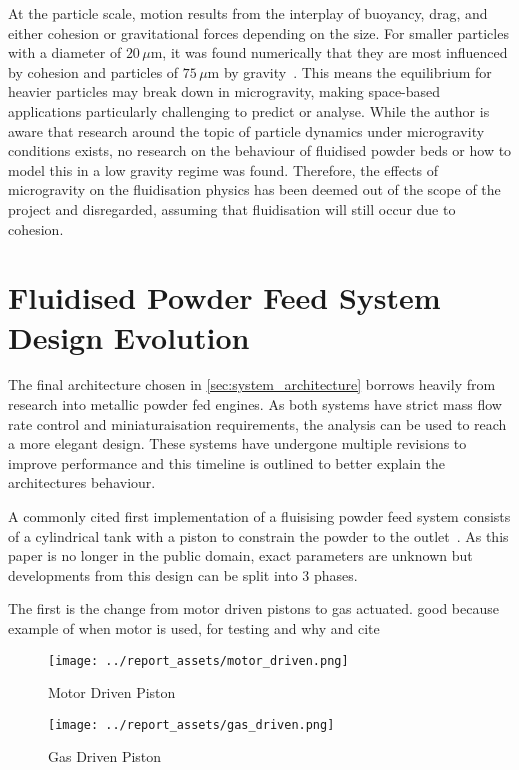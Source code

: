At the particle scale, motion results from the interplay of buoyancy, drag, and either cohesion or gravitational forces depending on the size. For smaller particles with a diameter of $20\,\mu\mathrm{m}$, it was found numerically that they are most influenced by cohesion and particles of $75\,\mu\mathrm{m}$ by gravity~\cite{SUN201785}.  This means the equilibrium for heavier particles may break down in microgravity, making space-based applications particularly challenging to predict or analyse. While the author is aware that research around the topic of particle dynamics under microgravity conditions exists, no research on the behaviour of fluidised powder beds or how to model this in a low gravity regime was found. Therefore, the effects of microgravity on the fluidisation physics has been deemed out of the scope of the project and disregarded, assuming that fluidisation will still occur due to cohesion.

\newpage

\section{Fluidised Powder Feed System Design Evolution}\label{sec:fluidised-powder-feed-systems}
The final architecture chosen in \autoref{sec:system_architecture} borrows heavily from research into metallic powder fed engines. As both systems have strict mass flow rate control and miniaturaisation requirements, the analysis can be used to reach a more elegant design. These systems have undergone multiple revisions to improve performance and this timeline is outlined to better explain the architectures behaviour.

A commonly cited first implementation of a fluisising powder feed system consists of a cylindrical tank with a piston to constrain the powder to the outlet~\cite{LI2021712}. As this paper is no longer in the public domain, exact parameters are unknown but developments from this design can be split into 3 phases.

The first is the change from motor driven pistons to gas actuated.
good because
example of when motor is used, for testing and why and cite 
\begin{figure}[htbp]
    \centering
    
    \begin{minipage}{0.45\textwidth}
        \centering
        \texttt{[image: ../report\_assets/motor\_driven.png]}
        \caption*{Motor Driven Piston~\cite{SUN201630}}
    \end{minipage}
    \hfill
    \begin{minipage}{0.45\textwidth}
        \centering
        \texttt{[image: ../report\_assets/gas\_driven.png]}
        \caption*{Gas Driven Piston~\cite{Li2016}}
    \end{minipage}
    
\end{figure}

